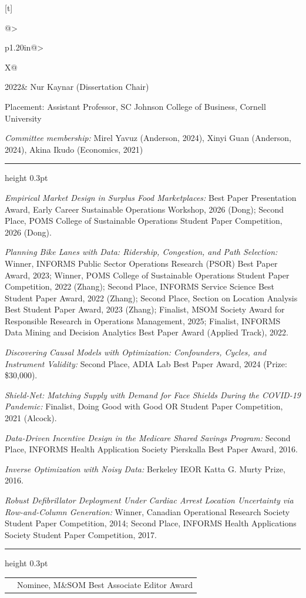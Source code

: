\documentclass[11pt,letterpaper]{article}
\makeatletter
\newcommand{\cvsection}[1]{\par\addvspace{8pt}\Needspace{4\baselineskip}{\normalsize\scshape #1\par}\vspace{2pt}\hrule height 0.3pt\vspace{5pt}}
\newcommand{\cvnotes}[1]{{\fontsize{9.2}{10.6}\selectfont\leftskip=1.325in\noindent #1\par}\vspace{2pt}}
\newcommand{\cvaward}[2]{\par\addvspace{4pt}\Needspace{3\baselineskip}\noindent\textit{#1:} #2\par}
\newcommand{\cventry}[2]{\par\Needspace{2\baselineskip}\noindent\begin{tabularx}{\linewidth}[t]{@{}>{\raggedright\arraybackslash}p{1.20in}@{\hspace{9pt}}>{\raggedright\arraybackslash}X@{}}{\small #1}& #2\end{tabularx}\par\vspace{0pt}}
\makeatother
\begin{document}
\cventry{2022}{Nur Kaynar (Dissertation Chair)}
\cvnotes{Placement: Assistant Professor, SC Johnson College of Business, Cornell University}

\vspace{3pt}\textit{Committee membership:} Mirel Yavuz (Anderson, 2024), Xinyi Guan (Anderson, 2024), Akina Ikudo (Economics, 2021)\par

\cvsection{Paper Awards}

\cvaward{Empirical Market Design in Surplus Food Marketplaces}{Best Paper Presentation Award, Early Career Sustainable Operations Workshop, 2026 (Dong); Second Place, POMS College of Sustainable Operations Student Paper Competition, 2026 (Dong).}

\cvaward{Planning Bike Lanes with Data: Ridership, Congestion, and Path Selection}{Winner, INFORMS Public Sector Operations Research (PSOR) Best Paper Award, 2023; Winner, POMS College of Sustainable Operations Student Paper Competition, 2022 (Zhang); Second Place, INFORMS Service Science Best Student Paper Award, 2022 (Zhang); Second Place, Section on Location Analysis Best Student Paper Award, 2023 (Zhang); Finalist, MSOM Society Award for Responsible Research in Operations Management, 2025; Finalist, INFORMS Data Mining and Decision Analytics Best Paper Award (Applied Track), 2022.}

\cvaward{Discovering Causal Models with Optimization: Confounders, Cycles, and Instrument Validity}{Second Place, ADIA Lab Best Paper Award, 2024 (Prize: \$30,000).}

\cvaward{Shield-Net: Matching Supply with Demand for Face Shields During the COVID-19 Pandemic}{Finalist, Doing Good with Good OR Student Paper Competition, 2021 (Alcock).}

\cvaward{Data-Driven Incentive Design in the Medicare Shared Savings Program}{Second Place, INFORMS Health Application Society Pierskalla Best Paper Award, 2016.}

\cvaward{Inverse Optimization with Noisy Data}{Berkeley IEOR Katta G. Murty Prize, 2016.}

\cvaward{Robust Defibrillator Deployment Under Cardiac Arrest Location Uncertainty via Row-and-Column Generation}{Winner, Canadian Operational Research Society Student Paper Competition, 2014; Second Place, INFORMS Health Applications Society Student Paper Competition, 2017.}

\cvsection{Awards}

\cventry{2026}{Nominee, M\&SOM Best Associate Editor Award}
\end{document}
